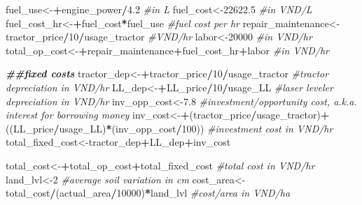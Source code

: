 \documentclass[
]{article}
\newenvironment{Shaded}{\begin{snugshade}}{\end{snugshade}}
\newcommand{\CommentTok}[1]{\textcolor[rgb]{0.56,0.35,0.01}{\textit{#1}}}
\newcommand{\DecValTok}[1]{\textcolor[rgb]{0.00,0.00,0.81}{#1}}
\newcommand{\DocumentationTok}[1]{\textcolor[rgb]{0.56,0.35,0.01}{\textbf{\textit{#1}}}}
\newcommand{\FloatTok}[1]{\textcolor[rgb]{0.00,0.00,0.81}{#1}}
\newcommand{\NormalTok}[1]{#1}
\newcommand{\OtherTok}[1]{\textcolor[rgb]{0.56,0.35,0.01}{#1}}
\newcommand{\SpecialCharTok}[1]{\textcolor[rgb]{0.81,0.36,0.00}{\textbf{#1}}}
\begin{document}
\begin{Shaded}
\begin{Highlighting}[]
\NormalTok{fuel\_use}\OtherTok{\textless{}{-}}\SpecialCharTok{+}\NormalTok{engine\_power}\SpecialCharTok{/}\FloatTok{4.2} \CommentTok{\#in L}
\NormalTok{fuel\_cost}\OtherTok{\textless{}{-}}\FloatTok{22622.5} \CommentTok{\#in VND/L}
\NormalTok{fuel\_cost\_hr}\OtherTok{\textless{}{-}}\SpecialCharTok{+}\NormalTok{fuel\_cost}\SpecialCharTok{*}\NormalTok{fuel\_use }\CommentTok{\#fuel cost per hr}
\NormalTok{repair\_maintenance}\OtherTok{\textless{}{-}}\NormalTok{tractor\_price}\SpecialCharTok{/}\DecValTok{10}\SpecialCharTok{/}\NormalTok{usage\_tractor }\CommentTok{\#VND/hr}
\NormalTok{labor}\OtherTok{\textless{}{-}}\DecValTok{20000} \CommentTok{\#in VND/hr}
\NormalTok{total\_op\_cost}\OtherTok{\textless{}{-}}\SpecialCharTok{+}\NormalTok{repair\_maintenance}\SpecialCharTok{+}\NormalTok{fuel\_cost\_hr}\SpecialCharTok{+}\NormalTok{labor }\CommentTok{\#in VND/hr}

\DocumentationTok{\#\#fixed costs}
\NormalTok{tractor\_dep}\OtherTok{\textless{}{-}}\SpecialCharTok{+}\NormalTok{tractor\_price}\SpecialCharTok{/}\DecValTok{10}\SpecialCharTok{/}\NormalTok{usage\_tractor }\CommentTok{\#tractor depreciation in VND/hr}
\NormalTok{LL\_dep}\OtherTok{\textless{}{-}}\SpecialCharTok{+}\NormalTok{LL\_price}\SpecialCharTok{/}\DecValTok{10}\SpecialCharTok{/}\NormalTok{usage\_LL }\CommentTok{\#laser leveler depreciation in VND/hr}
\NormalTok{inv\_opp\_cost}\OtherTok{\textless{}{-}}\FloatTok{7.8} \CommentTok{\#investment/opportunity cost, a.k.a. interest for borrowing money}
\NormalTok{inv\_cost}\OtherTok{\textless{}{-}}\SpecialCharTok{+}\NormalTok{(tractor\_price}\SpecialCharTok{/}\NormalTok{usage\_tractor)}\SpecialCharTok{+}\NormalTok{((LL\_price}\SpecialCharTok{/}\NormalTok{usage\_LL)}\SpecialCharTok{*}\NormalTok{(inv\_opp\_cost}\SpecialCharTok{/}\DecValTok{100}\NormalTok{)) }\CommentTok{\#investment cost in VND/hr}
\NormalTok{total\_fixed\_cost}\OtherTok{\textless{}{-}}\NormalTok{tractor\_dep}\SpecialCharTok{+}\NormalTok{LL\_dep}\SpecialCharTok{+}\NormalTok{inv\_cost}

\NormalTok{total\_cost}\OtherTok{\textless{}{-}}\SpecialCharTok{+}\NormalTok{total\_op\_cost}\SpecialCharTok{+}\NormalTok{total\_fixed\_cost }\CommentTok{\#total cost in VND/hr}
\NormalTok{land\_lvl}\OtherTok{\textless{}{-}}\DecValTok{2} \CommentTok{\#average soil variation in cm}
\NormalTok{cost\_area}\OtherTok{\textless{}{-}}\NormalTok{total\_cost}\SpecialCharTok{/}\NormalTok{(actual\_area}\SpecialCharTok{/}\DecValTok{10000}\NormalTok{)}\SpecialCharTok{*}\NormalTok{land\_lvl }\CommentTok{\#cost/area in VND/ha}


\end{Highlighting}
\end{Shaded}
\end{document}
